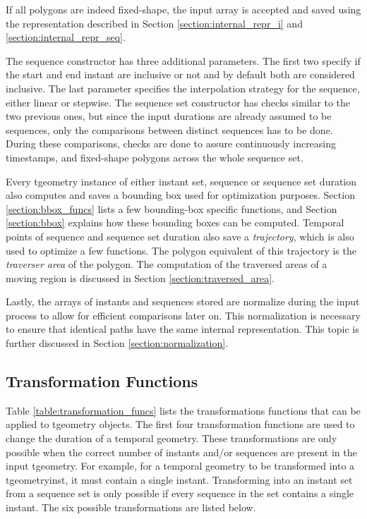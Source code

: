 
If all polygons are indeed fixed-shape, the input array is accepted and saved using the representation described in Section \ref{section:internal_repr_i} and \ref{section:internal_repr_seq}.

The sequence constructor has three additional parameters. The first two specify if the start and end instant are inclusive or not and by default both are considered inclusive. The last parameter specifies the interpolation strategy for the sequence, either linear or stepwise. The sequence set constructor has checks similar to the two previous ones, but since the input durations are already assumed to be sequences, only the comparisons between distinct sequences has to be done. During these comparisons, checks are done to assure continuously increasing timestamps, and fixed-shape polygons across the whole sequence set.

Every tgeometry instance of either instant set, sequence or sequence set duration also computes and saves a bounding box used for optimization purposes. Section \ref{section:bbox_funcs} lists a few bounding-box specific functions, and Section \ref{section:bbox} explains how these bounding boxes can be computed. Temporal points of sequence and sequence set duration also save a \textit{trajectory}, which is also used to optimize a few functions. The polygon equivalent of this trajectory is the \textit{traverser area} of the polygon. The computation of the traversed areas of a moving region is discussed in Section \ref{section:traversed_area}.

Lastly, the arrays of instants and sequences stored are normalize during the input process to allow for efficient comparisons later on. This normalization is necessary to ensure that identical paths have the same internal representation. This topic is further discussed in Section \ref{section:normalization}.

\subsection{Transformation Functions}
\label{section:transformation_funcs}

Table \ref{table:transformation_funcs} lists the transformations functions that can be applied to tgeometry objects. The first four transformation functions are used to change the duration of a temporal geometry. These transformations are only possible when the correct number of instants and/or sequences are present in the input tgeometry. For example, for a temporal geometry to be transformed into a tgeometryinst, it must contain a single instant. Transforming into an instant set from a sequence set is only possible if every sequence in the set contains a single instant. The six possible transformations are listed below.

